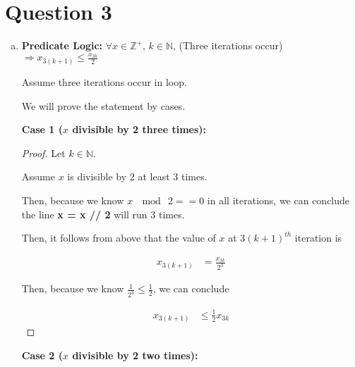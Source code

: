 \documentclass[12pt]{article}
\begin{document}
\section*{Question 3}
\begin{enumerate}[a.]
    \item

    \textbf{Predicate Logic:} $\forall x \in \mathbb{Z}^{+}$, $k \in \mathbb{N}$,
    (Three iterations occur) $\Rightarrow x_{3(k+1)} \leq \displaystyle\frac{x_{3k}}{2}$

    \bigskip

    Assume three iterations occur in loop.

    \bigskip

    We will prove the statement by cases.

    \bigskip

    \textbf{Case 1 ($x$ divisible by 2 three times):}

    \bigskip

    \begin{proof}
        Let $k \in \mathbb{N}$.

        \bigskip

        Assume $x$ is divisible by 2 at least 3 times.

        \bigskip

        Then, because we know $x\:\mod\:2 == 0$ in all iterations, we can conclude
        the line \textbf{x = x // 2} will run 3 times.

        \bigskip

        Then, it follows from above that the value of $x$ at $3(k+1)^{th}$ iteration
        is

        \begin{align}
            x_{3(k+1)} &= \frac{x_{3k}}{2^3}
        \end{align}

        \bigskip

        Then, because we know $\frac{1}{2^3} \leq \frac{1}{2}$, we can conclude

        \begin{align}
            x_{3(k+1)} &\leq \frac{1}{2} x_{3k}
        \end{align}

    \end{proof}

    \bigskip

    \textbf{Case 2 ($x$ divisible by 2 two times):}

    \bigskip


\end{enumerate}
\end{document}
